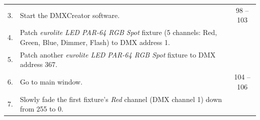 \begin{longtable}[]{@{}rlc@{}}
\begin{minipage}[t]{0.05\columnwidth}\raggedleft\strut
3.\strut
\end{minipage} & \begin{minipage}[t]{0.74\columnwidth}\raggedright\strut
Start the DMXCreator software.\strut
\end{minipage} & \begin{minipage}[t]{0.13\columnwidth}\centering\strut
98 -- 103\strut
\end{minipage}\tabularnewline
\begin{minipage}[t]{0.05\columnwidth}\raggedleft\strut
4.\strut
\end{minipage} & \begin{minipage}[t]{0.74\columnwidth}\raggedright\strut
Patch \emph{eurolite LED PAR-64 RGB Spot} fixture (5 channels: Red,
Green, Blue, Dimmer, Flash) to DMX address 1.\strut
\end{minipage} & \begin{minipage}[t]{0.13\columnwidth}\centering\strut
\strut
\end{minipage}\tabularnewline
\begin{minipage}[t]{0.05\columnwidth}\raggedleft\strut
5.\strut
\end{minipage} & \begin{minipage}[t]{0.74\columnwidth}\raggedright\strut
Patch another \emph{eurolite LED PAR-64 RGB Spot} fixture to DMX address
367.\strut
\end{minipage} & \begin{minipage}[t]{0.13\columnwidth}\centering\strut
\strut
\end{minipage}\tabularnewline
\begin{minipage}[t]{0.05\columnwidth}\raggedleft\strut
6.\strut
\end{minipage} & \begin{minipage}[t]{0.74\columnwidth}\raggedright\strut
Go to main window.\strut
\end{minipage} & \begin{minipage}[t]{0.13\columnwidth}\centering\strut
104 -- 106\strut
\end{minipage}\tabularnewline
\begin{minipage}[t]{0.05\columnwidth}\raggedleft\strut
7.\strut
\end{minipage} & \begin{minipage}[t]{0.74\columnwidth}\raggedright\strut
Slowly fade the first fixture's \emph{Red} channel (DMX channel 1) down
from 255 to 0.\strut
\end{minipage} & \begin{minipage}[t]{0.13\columnwidth}\centering\strut

\end{minipage}
\end{longtable}

